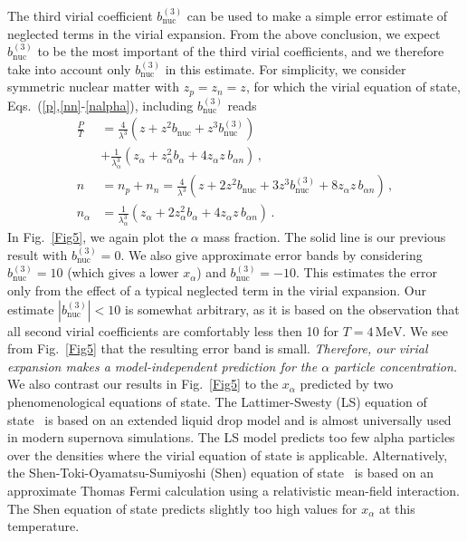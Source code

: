 \documentclass[aps,prc,twocolumn,showpacs,showkeys,amsmath,amssymb]{revtex4}
\newcommand{\mev}{\, \text{MeV}}
\begin{document}
The third virial coefficient $b_{\text{nuc}}^{(3)}$ can be used to
make a simple error estimate of neglected terms in the virial expansion. 
From the above conclusion, we expect $b_{\text{nuc}}^{(3)}$ to be 
the most important of the third virial coefficients, and we therefore
take into account only $b_{\text{nuc}}^{(3)}$ in this estimate.  
For simplicity, we consider symmetric nuclear matter with $z_p=z_n=z$,
for which the virial equation of state, Eqs.~(\ref{p},\ref{nn}-\ref{nalpha}),
including $b_{\text{nuc}}^{(3)}$ reads
\begin{align}
\frac{P}{T} &= \frac{4}{\lambda^3}(z+z^2b_{\text{nuc}}
+z^3b_{\text{nuc}}^{(3)}) \nonumber \\[1mm]
&+\frac{1}{\lambda_\alpha^3}(z_\alpha
+z_\alpha^2 b_\alpha +4z_\alpha z\,b_{\alpha n}) \,, \\[1mm]
n &= n_p+n_n =\frac{4}{\lambda^3}(z+2z^2 b_{\text{nuc}}
+3z^3b_{\text{nuc}}^{(3)}+8z_\alpha z\,b_{\alpha n}) \,, \\[1mm]
n_\alpha &= \frac{1}{\lambda_\alpha^3}(z_\alpha + 2z_\alpha^2 b_\alpha 
+ 4 z_\alpha z\,b_{\alpha n}) \,.
\end{align}
In Fig.~\ref{Fig5}, we again plot the $\alpha$ mass fraction.  The solid 
line is our previous result with $b_{\text{nuc}}^{(3)}=0$.  We also 
give approximate error bands by considering $b_{\text{nuc}}^{(3)}=10$ 
(which gives a lower $x_\alpha$) and $b_{\text{nuc}}^{(3)}=-10$.  
This estimates the error only from the effect of a 
typical neglected term in the virial expansion.  Our estimate 
$|b_{\text{nuc}}^{(3)}|<10$ is somewhat arbitrary, as it is based 
on the observation that all second virial coefficients are comfortably 
less then 10 for $T=4 \mev$.  We see from Fig.~\ref{Fig5} that the 
resulting error band is small.  {\it Therefore, our virial 
expansion makes a model-independent prediction for the $\alpha$ particle 
concentration.}  We also contrast our results in Fig.~\ref{Fig5} to
the $x_\alpha$ predicted by two phenomenological equations of state.  
The Lattimer-Swesty (LS) equation of state~\cite{LS} is based on an 
extended liquid drop model and is almost universally used in modern 
supernova simulations.  The LS model predicts too few alpha particles 
over the densities where the virial equation of state is applicable.  
Alternatively, the Shen-Toki-Oyamatsu-Sumiyoshi (Shen) equation of
state~\cite{Shen} is based on an approximate Thomas Fermi calculation
using a relativistic mean-field interaction. The Shen equation of state
predicts slightly too high values for $x_\alpha$ at this temperature.
\end{document}
